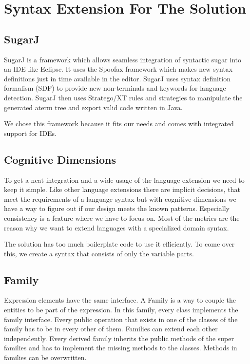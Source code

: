 \documentclass{report}
\begin{document}
\chapter{Syntax Extension For The Solution}



\section{SugarJ}

SugarJ \cite{Erdweg-SugarJ-2011} is a framework which allows seamless integration of syntactic sugar into an IDE like Eclipse. It uses the Spoofax framework which makes new syntax definitions just in time available in the editor. SugarJ uses syntax definition formalism (SDF) \cite{Heering-SDF-1989} to provide new non-terminals and keywords for language detection. SugarJ then uses Stratego/XT\cite{Kats-Spoofax-2010} rules and strategies to manipulate the generated aterm tree and export valid code written in Java.

We chose this framework because it fits our needs and comes with integrated support for IDEs. 

\section{Cognitive Dimensions}

To get a neat integration and a wide usage of the language extension we need to keep it simple. Like other language extensions there are implicit decisions, that meet the requirements of a language syntax but with cognitive dimensions \cite{Green-Cognitive-1996} we have a way to figure out if our design meets the known patterns. Especially consistency is a feature where we have to focus on. Most of the metrics are the reason why we want to extend languages with a specialized domain syntax.



\label{syntaxExtensionEP}
The solution has too much boilerplate code to use it efficiently. To come over this, we create a syntax that consists of only the variable parts.

\section{Family}

Expression elements have the same interface. A Family is a way to couple the entities to be part of the expression. In this family, every class implements the family interface. Every public operation that exists in one of the classes of the family has to be in every other of them. Families can extend each other independently. Every derived family inherits the public methods of the super families and has to implement the missing methods to the classes. Methods in families can be overwritten.
\end{document}
